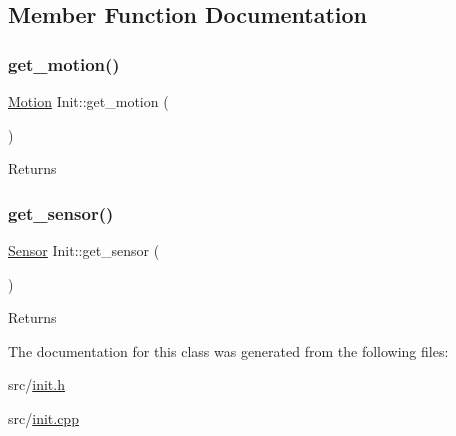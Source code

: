 \subsection{Member Function Documentation}
\mbox{\label{class_init_a2f0137392b84da9c02d9c4d892e44534}} 
\subsubsection{\texorpdfstring{get\+\_\+motion()}{get\_motion()}}
{\footnotesize\ttfamily \mbox{\hyperlink{class_motion}{Motion}} Init\+::get\+\_\+motion (\begin{DoxyParamCaption}{ }\end{DoxyParamCaption})}

\begin{DoxyReturn}{Returns}

\end{DoxyReturn}
\mbox{\label{class_init_a8d5597fb9e9bfb192a235cdee32ede2d}} 
\subsubsection{\texorpdfstring{get\+\_\+sensor()}{get\_sensor()}}
{\footnotesize\ttfamily \mbox{\hyperlink{class_sensor}{Sensor}} Init\+::get\+\_\+sensor (\begin{DoxyParamCaption}{ }\end{DoxyParamCaption})}

\begin{DoxyReturn}{Returns}

\end{DoxyReturn}


The documentation for this class was generated from the following files\+:\begin{DoxyCompactItemize}
\item 
src/\mbox{\hyperlink{init_8h}{init.\+h}}\item 
src/\mbox{\hyperlink{init_8cpp}{init.\+cpp}}\end{DoxyCompactItemize}

